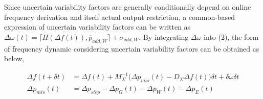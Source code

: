 \documentclass[lettersize,journal]{IEEEtran}
\newenvironment{newsubequations}{\small\begin{subequations}}{\end{subequations}}
\begin{document}


Since uncertain variability factors are generally conditionally depend on online frequency derivation and itself actual output restriction, a common-based expression of uncertain variability factors can be written as \(\varDelta \omega(t) = \lceil H(\varDelta f(t)), \overline{p}_{add,W}\rceil + \sigma_{add,W}\). By integrating \(\varDelta \omega\) into (2), the form of frequency dynamic considering uncertain variability factors can be obtained as below,

\begin{newsubequations}\label{eqn:3}
	\begin{align}
		\varDelta f(t + \delta t) & =\varDelta f(t)+M_{\varSigma}^{-1}\bigl(\varDelta p_{mis}(t)-D_{\varSigma} \varDelta f(t)\bigr) \delta t + \delta \omega\delta t \label{time-discretized SFR: swing equation} \\
		\varDelta p_{mis}(t)            & =\varDelta p_{{step}}-\varDelta p_{G}(t)-\varDelta p_{W}(t)-\varDelta p_{E}(t) \label{time-discretized SFR: mismatch power}                                             \\
	\end{align}
\end{newsubequations}
\end{document}
